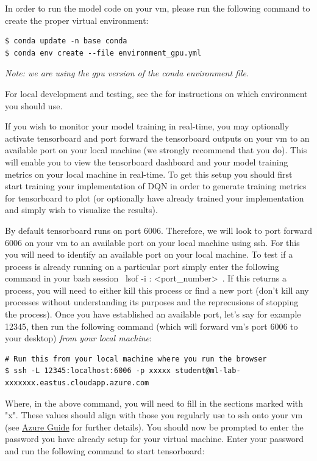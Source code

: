 In order to run the model code on your vm, please run the following command to create the proper virtual environment:

\begin{lstlisting}
$ conda update -n base conda
$ conda env create --file environment_gpu.yml
\end{lstlisting}

\textit{Note: we are using the gpu version of the conda environment file.}

For local development and testing, see the  for instructions on which environment you should use.

If you wish to monitor your model training in real-time, you may optionally activate tensorboard and port forward the tensorboard outputs on your vm to an available port on your local machine (we strongly recommend that you do). This will enable you to view the tensorboard dashboard and your model training metrics on your local machine in real-time. To get this setup you should first start training your implementation of DQN in order to generate training metrics for tensorboard to plot (or optionally have already trained your implementation and simply wish to visualize the results).

By default tensorboard runs on port 6006. Therefore, we will look to port forward 6006 on your vm to an available port on your local machine using ssh. For this you will need to identify an available port on your local machine. To test if a process is already running on a particular port simply enter the following command in your bash session ~lsof -i : <port_number>~. If this returns a process, you will need to either kill this process or find a new port (don't kill any processes without understanding its purposes and the reprecusions of stopping the process). Once you have established an available port, let's say for example 12345, then run the following command (which will forward vm's port 6006 to your desktop) \textit{from your local machine}:

\begin{lstlisting}
# Run this from your local machine where you run the browser
$ ssh -L 12345:localhost:6006 -p xxxxx student@ml-lab-xxxxxxx.eastus.cloudapp.azure.com
\end{lstlisting}

Where, in the above command, you will need to fill in the sections marked with "x". These values should align with those you regularly use to ssh onto your vm (see \href{https://github.com/scpd-proed/XCS234-Handouts/blob/main/Azure/Azure%20Guide.pdf}{Azure Guide} for further details). You should now be prompted to enter the password you have already setup for your virtual machine. Enter your password and run the following command to start tensorboard:

